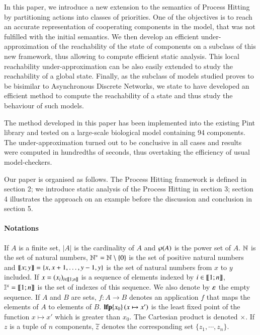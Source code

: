 In this paper, we introduce a new extension to the semantics of Process Hitting by partitioning actions into classes of priorities.
One of the objectives is to reach an accurate representation of cooperating components in the model, that was not fulfilled with the initial semantics.
We then develop an efficient under-approximation of the reachability of the state of components on a subclass of this new framework, thus allowing to compute efficient static analysis.
This local reachability under-approximation can be also easily extended to study the reachability of a global state.
Finally, as the subclass of models studied proves to be bisimilar to Asynchronous Discrete Networks, we state to have developed an efficient method to compute the reachability of a state and thus study the behaviour of such models.

The method developed in this paper has been implemented into the existing Pint library and tested on a large-scale biological model containing 94 components.
The under-approximation turned out to be conclusive in all cases and results were computed in hundredths of seconds,
thus overtaking the efficiency of usual model-checkers.



Our paper is organised as follows.
The Process Hitting framework is defined in section 2;
we introduce static analysis of the Process Hitting in section 3;
section 4 illustrates the approach on an example
before the discussion and conclusion in section 5.



\paragraph*{Notations}

If $A$ is a finite set,
$|A|$ is the cardinality of $A$
and $\wp(A)$ is the power set of $A$.
$\mathbb{N}$ is the set of natural numbers,
$\mathbb{N}^* = \mathbb{N} \setminus \{ 0 \}$ is the set of positive natural numbers
and $\llbracket x; y \rrbracket = \{ x, x+1, \dots, y-1, y \}$ is the set of natural numbers from $x$ to $y$ included.
If $x = (x_i)_{i \in \llbracket 1; n \rrbracket}$ is a sequence of elements indexed by $i \in \llbracket 1; n \rrbracket$,
$\mathbb{I}^{x} = \llbracket 1; n \rrbracket$ is the set of indexes of this sequence.
We also denote by $\varepsilon$ the empty sequence.
If $A$ and $B$ are sets,
$f : A \rightarrow B$ denotes an application $f$ that maps the elements of $A$ to elements of $B$.
$\mathbf{lfp}\{x_0\}\left(x\mapsto x'\right)$ is the least fixed point of the function $x \mapsto x'$ which is greater than $x_0$.
The Cartesian product is denoted $\times$.
If $z$ is a tuple of $n$ components, $\widetilde{z}$ denotes the corresponding set
	$\{z_1, \cdots, z_n\}$.
